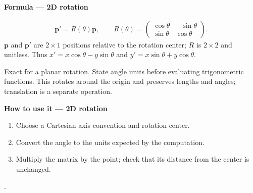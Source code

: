 \documentclass[letterpaper,11pt,english,openany,oneside]{jupyterBook}
\begin{document}
\begin{TextbookBox}
\textbf{Formula — 2D rotation}\par\smallskip
\begin{equation}\label{equation:lectures/lecture01/transformations:eq-lec01-rotation2}
\begin{split}\mathbf{p}'=R(\theta)\mathbf{p},\qquad
R(\theta)=\begin{pmatrix}\cos\theta&-\sin\theta\\\sin\theta&\cos\theta\end{pmatrix}.\end{split}
\end{equation}
\sphinxAtStartPar
\(\mathbf{p}\) and \(\mathbf{p}'\) are \(2\times1\) positions relative to the rotation center; \(R\) is \(2\times2\) and unitless. Thus \(x'=x\cos\theta-y\sin\theta\) and \(y'=x\sin\theta+y\cos\theta\).

\sphinxAtStartPar
{} Exact for a planar rotation. State angle units before evaluating trigonometric functions. This rotates around the origin and preserves lengths and angles; translation is a separate operation.

\end{TextbookBox}

\begin{TextbookBox}
\textbf{How to use it — 2D rotation}\par\smallskip
\begin{enumerate}
%
\item {}
\sphinxAtStartPar
Choose a Cartesian axis convention and rotation center.

\item {}
\sphinxAtStartPar
Convert the angle to the units expected by the computation.

\item {}
\sphinxAtStartPar
Multiply the matrix by the point; check that its distance from the center is unchanged.

\end{enumerate}

\sphinxAtStartPar
{} {\hyperref[\detokenize{lectures/lecture01/transformations:ex-lec01-pivot}]{}}.

\end{TextbookBox}
\end{document}

